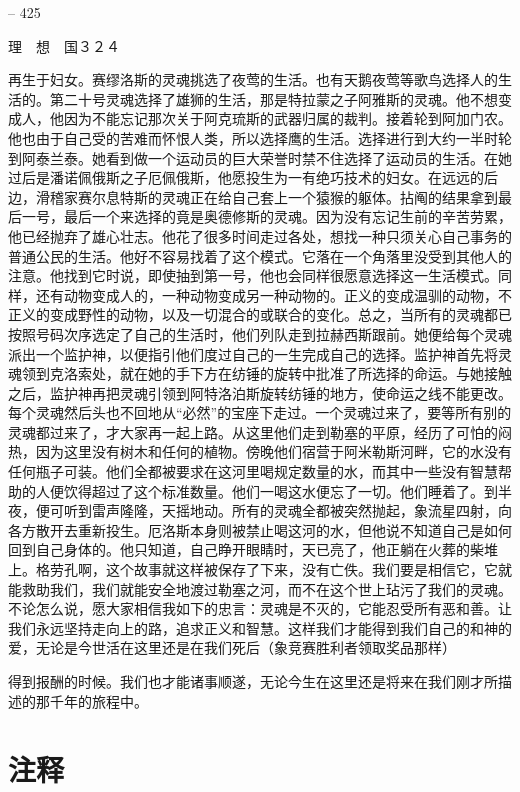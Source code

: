 \documentclass[11pt,oneside]{book}
\begin{document}
\begin{common-format}
    

-- 425

    理　想　国３２４

    再生于妇女。赛缪洛斯的灵魂挑选了夜莺的生活。也有天鹅夜莺等歌鸟选择人的生活的。第二十号灵魂选择了雄狮的生活，那是特拉蒙之子阿雅斯的灵魂。他不想变成人，他因为不能忘记那次关于阿克琉斯的武器归属的裁判。接着轮到阿加门农。他也由于自己受的苦难而怀恨人类，所以选择鹰的生活。选择进行到大约一半时轮到阿泰兰泰。她看到做一个运动员的巨大荣誉时禁不住选择了运动员的生活。在她过后是潘诺佩俄斯之子厄佩俄斯，他愿投生为一有绝巧技术的妇女。在远远的后边，滑稽家赛尔息特斯的灵魂正在给自己套上一个猿猴的躯体。拈阄的结果拿到最后一号，最后一个来选择的竟是奥德修斯的灵魂。因为没有忘记生前的辛苦劳累，他已经抛弃了雄心壮志。他花了很多时间走过各处，想找一种只须关心自己事务的普通公民的生活。他好不容易找着了这个模式。它落在一个角落里没受到其他人的注意。他找到它时说，即使抽到第一号，他也会同样很愿意选择这一生活模式。同样，还有动物变成人的，一种动物变成另一种动物的。正义的变成温驯的动物，不正义的变成野性的动物，以及一切混合的或联合的变化。总之，当所有的灵魂都已按照号码次序选定了自己的生活时，他们列队走到拉赫西斯跟前。她便给每个灵魂派出一个监护神，以便指引他们度过自己的一生完成自己的选择。监护神首先将灵魂领到克洛索处，就在她的手下方在纺锤的旋转中批准了所选择的命运。与她接触之后，监护神再把灵魂引领到阿特洛泊斯旋转纺锤的地方，使命运之线不能更改。每个灵魂然后头也不回地从“必然”的宝座下走过。一个灵魂过来了，要等所有别的灵魂都过来了，才大家再一起上路。从这里他们走到勒塞的平原，经历了可怕的闷热，因为这里没有树木和任何的植物。傍晚他们宿营于阿米勒斯河畔，它的水没有任何瓶子可装。他们全都被要求在这河里喝规定数量的水，而其中一些没有智慧帮助的人便饮得超过了这个标准数量。他们一喝这水便忘了一切。他们睡着了。到半夜，便可听到雷声隆隆，天摇地动。所有的灵魂全都被突然抛起，象流星四射，向各方散开去重新投生。厄洛斯本身则被禁止喝这河的水，但他说不知道自己是如何回到自己身体的。他只知道，自己睁开眼睛时，天已亮了，他正躺在火葬的柴堆上。格劳孔啊，这个故事就这样被保存了下来，没有亡佚。我们要是相信它，它就能救助我们，我们就能安全地渡过勒塞之河，而不在这个世上玷污了我们的灵魂。不论怎么说，愿大家相信我如下的忠言：灵魂是不灭的，它能忍受所有恶和善。让我们永远坚持走向上的路，追求正义和智慧。这样我们才能得到我们自己的和神的爱，无论是今世活在这里还是在我们死后（象竞赛胜利者领取奖品那样）

得到报酬的时候。我们也才能诸事顺遂，无论今生在这里还是将来在我们刚才所描述的那千年的旅程中。

    

\chapter{注释}
\showendnotes



\end{common-format}
\end{document}
